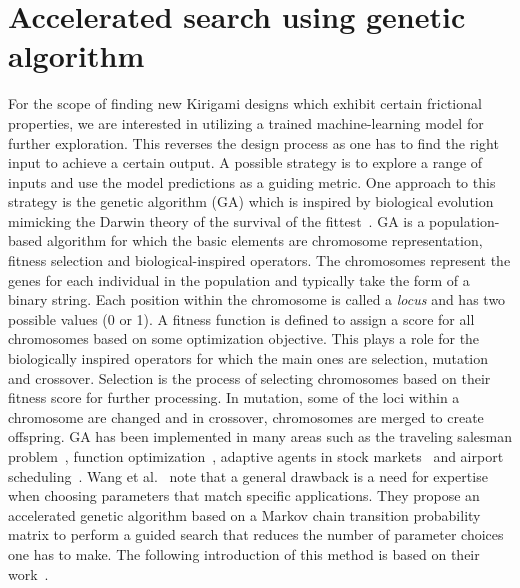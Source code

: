 \section{Accelerated search using genetic algorithm}\label{sec:GA}
For the scope of finding new Kirigami designs which exhibit certain frictional properties, we are interested in utilizing a trained machine-learning model for further exploration. This reverses the design process as one has to find the right input to achieve a certain output. A possible strategy is to explore a range of inputs and use the model predictions as a guiding metric. One approach to this strategy is the genetic algorithm (\acrshort{GA}) which is inspired by biological evolution mimicking the Darwin theory of the survival of the fittest~\cite{katoch_review_2021}. \acrshort{GA} is a population-based algorithm for
which the basic elements are chromosome representation, fitness selection and
biological-inspired operators. The chromosomes represent the genes for each
individual in the population and typically take the form of a binary string.
Each position within the chromosome is called a \textit{locus} and has two
possible values (0 or 1). A fitness function is defined to assign a score for
all chromosomes based on some optimization objective. This plays a role for the
biologically inspired operators for which the main ones are selection, mutation
and crossover. Selection is the process of selecting chromosomes based on their
fitness score for further processing. In mutation, some of the loci within a
chromosome are changed and in crossover, chromosomes are merged to create
offspring. \acrshort{GA} has been implemented in many areas such as the traveling salesman problem~\cite{jiang2000distributed}, function optimization~\cite{szeto1998effects}, adaptive agents in stock markets~\cite{szeto2000adaptive} and airport scheduling~\cite{shiu2008self}. Wang et al.~\cite{Wang2010} note that a general drawback is a need for expertise when choosing parameters that match specific applications. They propose an accelerated genetic algorithm based on a Markov chain transition probability matrix to perform a guided search that reduces the number of parameter choices one has to make. The following introduction of this method is based on their work~\cite{Wang2010}.

